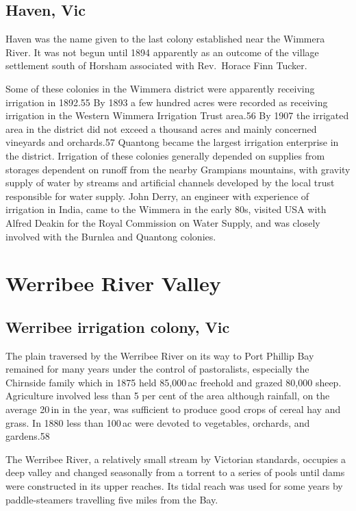 \subsection{Haven, Vic}

Haven was the name given to the last colony established near the
Wimmera River. It was not begun until 1894 apparently as an outcome of
the village settlement south of Horsham associated with Rev.~Horace
Finn Tucker.

Some of these colonies in the Wimmera district were apparently
receiving irrigation in 1892.55 By 1893 a few hundred acres were
recorded as receiving irrigation in the Western Wimmera Irrigation
Trust area.56 By 1907 the irrigated area in the district did not
exceed a thousand acres and mainly concerned vineyards and orchards.57
Quantong became the largest irrigation enterprise in the
district. Irrigation of these colonies generally depended on supplies
from storages dependent on runoff from the nearby Grampians mountains,
with gravity supply of water by streams and artificial channels
developed by the local trust responsible for water supply. John Derry,
an engineer with experience of irrigation in India, came to the
Wimmera in the early 80s, visited USA with Alfred Deakin for the Royal
Commission on Water Supply, and was closely involved with the Burnlea
and Quantong colonies.

\section{Werribee River Valley}

\subsection{Werribee irrigation colony, Vic}

The plain traversed by the Werribee River on its way to Port Phillip
Bay remained for many years under the control of pastoralists,
especially the Chirnside family which in 1875 held 85,000\,ac freehold
and grazed 80,000 sheep. Agriculture involved less than 5 per cent of
the area although rainfall, on the average 20\,in in the year, was
sufficient to produce good crops of cereal hay and grass.  In 1880
less than 100\,ac were devoted to vegetables, orchards, and gardens.58

The Werribee River, a relatively small stream by Victorian standards,
occupies a deep valley and changed seasonally from a torrent to a
series of pools until dams were constructed in its upper reaches.  Its
tidal reach was used for some years by paddle-steamers travelling five
miles from the Bay.

